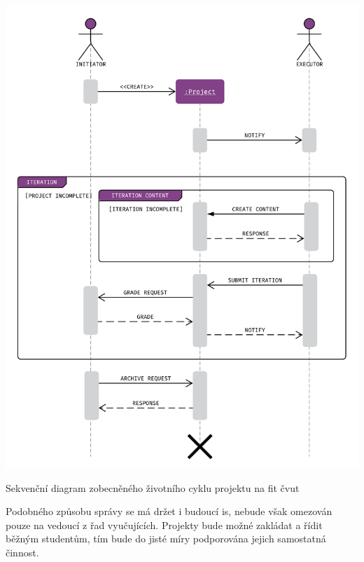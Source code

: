 \begin{fig:illustration}
   \includegraphics[width=1\textwidth]{images/dia-seq-study-project-lifecycle.pdf}
   \caption[Zobecněný životní cyklus projektu]{Sekvenční diagram zobecněného životního cyklu projektu na \gls{fit} \gls{čvut}}\label{pic:dia-seq-study-project-lifecycle}
\end{fig:illustration}


Podobného způsobu správy se má držet i budoucí \gls{is}, nebude však omezován pouze na vedoucí z řad vyučujících. Projekty bude možné zakládat a řídit běžným studentům, tím bude do jisté míry podporována jejich samostatná činnost.




